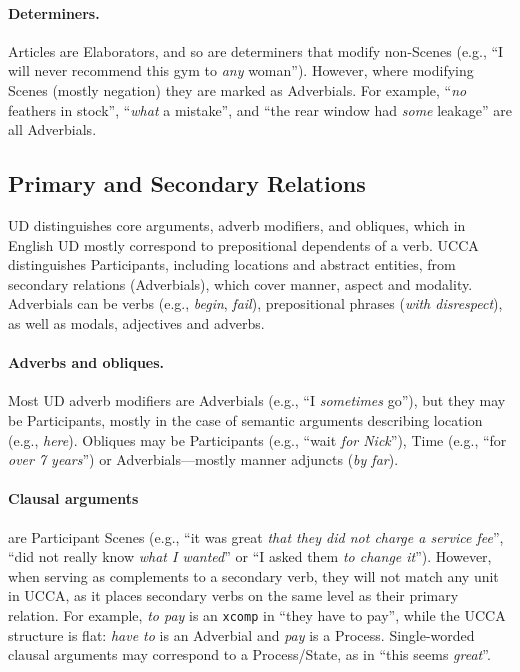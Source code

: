 \documentclass[11pt,a4paper,table]{article}
\begin{document}
\paragraph{Determiners.}
      Articles are Elaborators, and so are determiners that modify non-Scenes 
      (e.g., ``I will never recommend this gym to \textit{any} woman'').
      However, where modifying Scenes (mostly negation)
      they are marked as Adverbials. For example, ``\textit{no} feathers in stock'', ``\textit{what} a mistake'',
      and ``the rear window had \textit{some} leakage'' are all Adverbials.



\subsection{Primary and Secondary Relations}\label{sec:arguments}

UD distinguishes core arguments, adverb modifiers,
and obliques, which in English UD mostly correspond to prepositional dependents of a verb.
UCCA distinguishes Participants, including locations and abstract entities,
from secondary relations (Adverbials), 
which cover manner, aspect and modality.
Adverbials can be verbs (e.g., \textit{begin}, \textit{fail}),
prepositional phrases (\textit{with disrespect}),
as well as modals, adjectives and adverbs.

\paragraph{Adverbs and obliques.}
    Most UD adverb modifiers are Adverbials (e.g., ``I \textit{sometimes} go''),
    but they may be Participants, mostly in the case of semantic arguments describing location (e.g., \textit{here}).
    Obliques
    may be
    Participants (e.g., ``wait \textit{for Nick}''), Time (e.g., ``for \textit{over 7 years}'') 
    or Adverbials---mostly manner adjuncts (\textit{by far}).

\paragraph{Clausal arguments}
    are Participant Scenes
    (e.g., ``it was great \textit{that they did not charge a service fee}'',
    ``did not really know \textit{what I wanted}'' or
    ``I asked them \textit{to change it}'').
    However, when serving as complements to a secondary verb, they
    will not match any unit in UCCA, as it places secondary verbs on the 
    same level as their primary relation. 
    For example, \textit{to pay} is an \texttt{xcomp} in ``they have to pay'', while
    the UCCA structure is flat: \textit{have to} is an Adverbial and \textit{pay} is a Process.
    Single-worded clausal arguments may correspond to a Process/State,
    as in ``this seems \textit{great}''.
\end{document}
